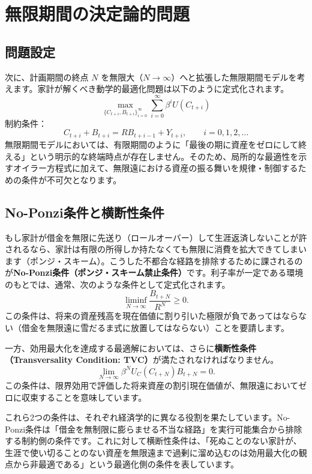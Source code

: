 \documentclass[
  japanese,
  lualatex,
  ja=standard,
  12pt,
  a4paper]{ltjsarticle}
\begin{document}
\section{無限期間の決定論的問題}\label{ux7121ux9650ux671fux9593ux306eux6c7aux5b9aux8ad6ux7684ux554fux984c}

\subsection{問題設定}\label{ux554fux984cux8a2dux5b9a-1}

次に、計画期間の終点 \(N\)
を無限大（\(N \to \infty\)）へと拡張した無限期間モデルを考えます。家計が解くべき動学的最適化問題は以下のように定式化されます。
\[
\max_{\{C_{t+i}, B_{t+i}\}_{i=0}^{\infty}} \sum_{i=0}^{\infty} \beta^i U(C_{t+i})
\] 制約条件： \[
C_{t+i} + B_{t+i} = R B_{t+i-1} + Y_{t+i}, \qquad i=0, 1, 2, \dots
\]
無限期間モデルにおいては、有限期間のように「最後の期に資産をゼロにして終える」という明示的な終端時点が存在しません。そのため、局所的な最適性を示すオイラー方程式に加えて、無限遠における資産の振る舞いを規律・制御するための条件が不可欠となります。

\subsection{No-Ponzi条件と横断性条件}\label{no-ponziux6761ux4ef6ux3068ux6a2aux65adux6027ux6761ux4ef6}

もし家計が借金を無限に先送り（ロールオーバー）して生涯返済しないことが許されるなら、家計は有限の所得しか持たなくても無限に消費を拡大できてしまいます（ポンジ・スキーム）。こうした不都合な経路を排除するために課されるのが\textbf{No-Ponzi条件（ポンジ・スキーム禁止条件）}です。利子率が一定である環境のもとでは、通常、次のような条件として定式化されます。
\[
\liminf_{N\to\infty} \frac{B_{t+N}}{R^N} \geq 0.
\]
この条件は、将来の資産残高を現在価値に割り引いた極限が負であってはならない（借金を無限遠に雪だるま式に放置してはならない）ことを要請します。

一方、効用最大化を達成する最適解においては、さらに\textbf{横断性条件（Transversality
Condition: TVC）}が満たされなければなりません。 \[
\lim_{N\to\infty} \beta^N U_C(C_{t+N}) B_{t+N} = 0.
\]
この条件は、限界効用で評価した将来資産の割引現在価値が、無限遠においてゼロに収束することを意味しています。

これら2つの条件は、それぞれ経済学的に異なる役割を果たしています。No-Ponzi条件は「借金を無制限に膨らませる不当な経路」を実行可能集合から排除する制約側の条件です。これに対して横断性条件は、「死ぬことのない家計が、生涯で使い切ることのない資産を無限遠まで過剰に溜め込むのは効用最大化の観点から非最適である」という最適化側の条件を表しています。
\end{document}
